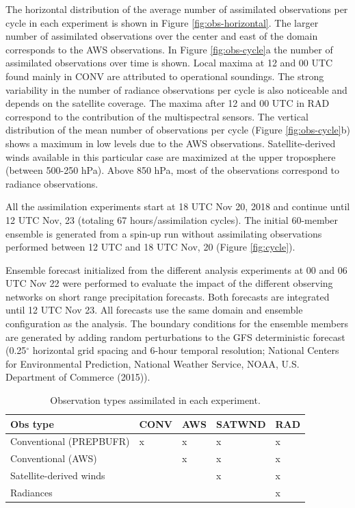 \documentclass[final,5p,times,twocolumn,authoryear]{elsarticle} %
\begin{document}
The horizontal distribution of the average number of assimilated observations per cycle in each experiment is shown in Figure \ref{fig:obs-horizontal}. The larger number of assimilated observations over the center and east of the domain corresponds to the AWS observations. In Figure \ref{fig:obs-cycle}a the number of assimilated observations over time is shown. Local maxima at 12 and 00 UTC found mainly in CONV are attributed to operational soundings. The strong variability in the number of radiance observations per cycle is also noticeable and depends on the satellite coverage. The maxima after 12 and 00 UTC in RAD correspond to the contribution of the multispectral sensors. The vertical distribution of the mean number of observations per cycle (Figure \ref{fig:obs-cycle}b) shows a maximum in low levels due to the AWS observations. Satellite-derived winds available in this particular case are maximized at the upper troposphere (between 500-250 hPa). Above 850 hPa, most of the observations correspond to radiance observations.

All the assimilation experiments start at 18 UTC Nov 20, 2018 and continue until 12 UTC Nov, 23 (totaling 67 hours/assimilation cycles). The initial 60-member ensemble is generated from a spin-up run without assimilating observations performed between 12 UTC and 18 UTC Nov, 20 (Figure \ref{fig:cycle}).

Ensemble forecast initialized from the different analysis experiments at 00 and 06 UTC Nov 22 were performed to evaluate the impact of the different observing networks on short range precipitation forecasts. Both forecasts are integrated until 12 UTC Nov 23. All forecasts use the same domain and ensemble configuration as the analysis. The boundary conditions for the ensemble members are generated by adding random perturbations to the GFS deterministic forecast (0.25\(^{\circ}\) horizontal grid spacing and 6-hour temporal resolution; National Centers for Environmental Prediction, National Weather Service, NOAA, U.S. Department of Commerce (2015)).

\begin{table}

\caption{\label{tab:table-exp}Observation types assimilated in each experiment.}
\centering
\begin{tabu} to 
\toprule
Obs type & CONV & AWS & SATWND & RAD\\
\midrule
Conventional (PREPBUFR) & x & x & x & x\\
Conventional (AWS) &  & x & x & x\\
Satellite-derived winds &  &  & x & x\\
Radiances &  &  &  & x\\
\bottomrule
\end{tabu}
\end{table}
\end{document}
